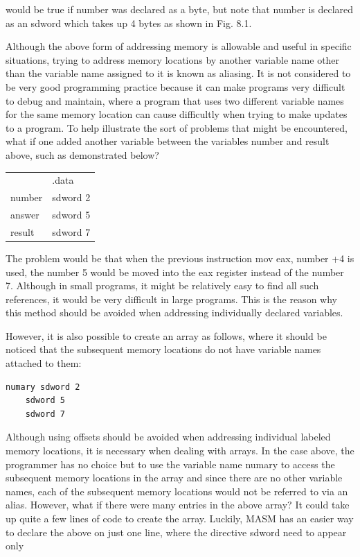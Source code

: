 \documentclass[10pt]{book}
\begin{document}
would be true if number was declared as a byte, but note that number is declared as an sdword which takes up 4 bytes as shown in Fig. 8.1.

Although the above form of addressing memory is allowable and useful in specific situations, trying to address memory locations by another variable name other than the variable name assigned to it is known as aliasing. It is not considered to be very good programming practice because it can make programs very difficult to debug and maintain, where a program that uses two different variable names for the same memory location can cause difficultly when trying to make updates to a program. To help illustrate the sort of problems that might be encountered, what if one added another variable between the variables number and result above, such as demonstrated below?

\begin{center}
\begin{tabular}{ll}
 & .data \\
number & sdword 2 \\
answer & sdword 5 \\
result & sdword 7 \\
\end{tabular}
\end{center}

The problem would be that when the previous instruction mov eax, number +4 is used, the number 5 would be moved into the eax register instead of the number 7. Although in small programs, it might be relatively easy to find all such references, it would be very difficult in large programs. This is the reason why this method should be avoided when addressing individually declared variables.

However, it is also possible to create an array as follows, where it should be noticed that the subsequent memory locations do not have variable names attached to them:

\begin{verbatim}
numary sdword 2
    sdword 5
    sdword 7
\end{verbatim}

Although using offsets should be avoided when addressing individual labeled memory locations, it is necessary when dealing with arrays. In the case above, the programmer has no choice but to use the variable name numary to access the subsequent memory locations in the array and since there are no other variable names, each of the subsequent memory locations would not be referred to via an alias. However, what if there were many entries in the above array? It could take up quite a few lines of code to create the array. Luckily, MASM has an easier way to declare the above on just one line, where the directive sdword need to appear only
\end{document}
